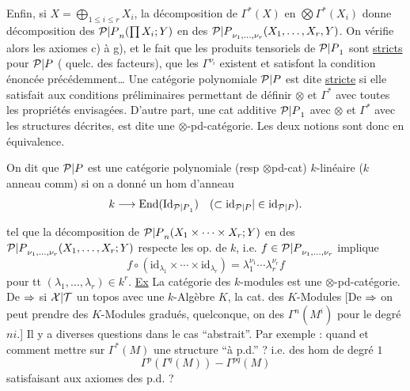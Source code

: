 Enfin, si $X=\bigoplus_{1\leq i\leq r}X_i$, la décomposition de $\Gamma^*(X)$ en  $\bigotimes\Gamma^*(X_i)$ donne  décomposition des ${\mathcal P|P}_n(\prod X_i;Y)$ en des ${\mathcal P|P}_{\nu_1,\ldots,\nu_r}(X_1,\ldots,X_r,Y)$.
On vérifie alors les axiomes c) à g), et le fait que  les produits tensoriels de ${\mathcal P|P}_1$ sont \uline{stricts} pour ${\mathcal P|P}$ ( quelc. des facteurs), que les $\Gamma^{\nu_i}$ existent et satisfont la condition énoncée précédemment\ldots
{}
Une catégorie polynomiale ${\mathcal P|P}$ est dite \uline{stricte} si elle satisfait aux conditions préliminaires permettant de définir $\otimes$ et $\Gamma^*$ avec toutes les propriétés envisagées. D'autre part, une cat additive ${\mathcal P|P}_1$ avec $\otimes$ et $\Gamma^*$ avec les structures décrites, est dite une $\otimes$-pd-catégorie. Les deux notions sont donc en équivalence.

On dit que ${\mathcal P|P}$ est  une catégorie polynomiale (resp $\otimes$pd-cat) $k$-linéaire ($k$ anneau comm) si on a donné un hom d'anneau
\[k\longrightarrow\operatorname{End}(\mathrm{Id}_{{\mathcal P|P}_1})\quad({\subset\mathrm{id}_{\mathcal P|P}|\in\mathrm{id}_{\mathcal P|P}}).\]

tel que la décomposition de ${\mathcal P|P}_n(X_1\times\cdots\times X_r;Y)$ en des ${\mathcal P|P}_{\nu_1,\ldots,\nu_r}(X_1,\ldots,X_r;Y)$ respecte les op. de $k$, i.e. $f\in {\mathcal P|P}_{\nu_1,\ldots,\nu_r}$ implique
\[f\circ(\mathrm{id}_{\lambda_1}\times\cdots\times\mathrm{id}_{\lambda_r})=\lambda_1^{\nu_1}\cdots\lambda_r^{\nu_r}f\]
pour tt $(\lambda_1,\ldots,\lambda_r)\in k^r$.
\uline{Ex} La catégorie des $k$-modules est une $\otimes$-pd-catégorie.
De ${\Rightarrow}$ si ${\mathcal X|\mathcal T}$ un topos avec une $k$-Algèbre $K$, la cat. des $K$-Modules
 [De ${\Rightarrow}$ on peut prendre des $K$-Modules gradués,  quelconque,  on  des  $\Gamma^n(M^i)$ pour le degré $ni$.]
Il y a diverses questions dans le cas ``abstrait''. Par exemple : quand et comment mettre sur $\Gamma^*(M)$  une structure ``à p.d.'' ? i.e. des hom de degré $1$
\[\Gamma^p(\Gamma^q(M))\mathbin{-}\Gamma^{pq}(M)\]
satisfaisant aux axiomes des p.d. ?

